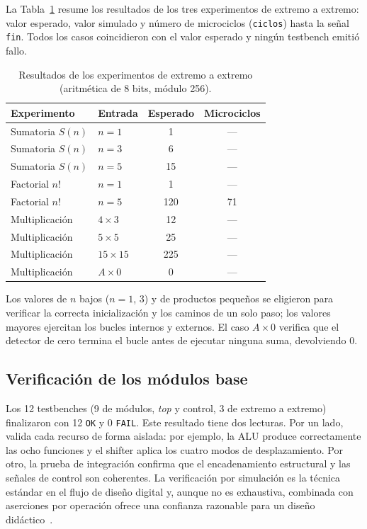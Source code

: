 \documentclass[llncs]{llncs}
\begin{document}
La Tabla~\ref{tab:resultados} resume los resultados de los tres experimentos
de extremo a extremo: valor esperado, valor simulado y número de microciclos
(\texttt{ciclos}) hasta la señal \texttt{fin}. Todos los casos coincidieron
con el valor esperado y ningún testbench emitió fallo.

\begin{table}[t]
  \caption{Resultados de los experimentos de extremo a extremo
  (aritmética de 8 bits, módulo 256).}
  \label{tab:resultados}
  \centering
  \small
  \begin{tabular}{llcc}
    \hline
    \textbf{Experimento} & \textbf{Entrada} & \textbf{Esperado} & \textbf{Microciclos}\\
    \hline
    Sumatoria $S(n)$   & $n=1$ & 1   & ---\\
    Sumatoria $S(n)$   & $n=3$ & 6   & ---\\
    Sumatoria $S(n)$   & $n=5$ & 15  & ---\\
    Factorial $n!$     & $n=1$ & 1   & ---\\
    Factorial $n!$     & $n=5$ & 120 & 71\\
    Multiplicación     & $4\times3$   & 12  & ---\\
    Multiplicación     & $5\times5$   & 25  & ---\\
    Multiplicación     & $15\times15$ & 225 & ---\\
    Multiplicación     & $A\times0$   & 0   & ---\\
    \hline
  \end{tabular}
\end{table}

Los valores de $n$ bajos ($n=1$, $3$) y de productos pequeños se eligieron
para verificar la correcta inicialización y los caminos de un solo paso; los
valores mayores ejercitan los bucles internos y externos. El caso $A\times0$
verifica que el detector de cero termina el bucle antes de ejecutar ninguna
suma, devolviendo 0.

\subsection{Verificación de los módulos base}

Los 12 testbenches (9 de módulos, \emph{top} y control, 3 de extremo a extremo)
finalizaron con 12 \texttt{OK} y 0 \texttt{FAIL}. Este resultado tiene dos
lecturas. Por un lado, valida cada recurso de forma aislada: por ejemplo, la
ALU produce correctamente las ocho funciones y el shifter aplica los cuatro
modos de desplazamiento. Por otro, la prueba de integración confirma que el
encadenamiento estructural y las señales de control son coherentes. La
verificación por simulación es la técnica estándar en el flujo de diseño
digital y, aunque no es exhaustiva, combinada con aserciones por operación
ofrece una confianza razonable para un diseño didáctico~\cite{kern1999}.
\end{document}
